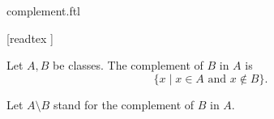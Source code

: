 \documentclass{stex}
\begin{document}
\begin{smodule}{complement.ftl}

  \begin{forthel}

    [readtex ]
  \end{forthel}

  \begin{forthel}
    \begin{definition}
      Let $A, B$ be classes.
      The complement of $B$ in $A$ is
      \[ \{ x \mid \text{$x \in A$ and $x \notin B$} \}. \]
    \end{definition}

    Let $A \setminus B$ stand for the complement of $B$ in $A$.
  \end{forthel}
\end{smodule}
\end{document}
